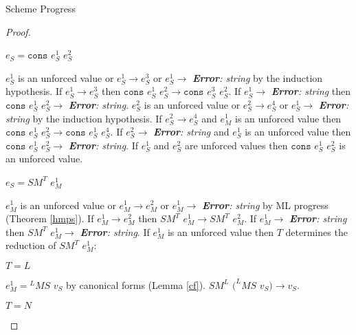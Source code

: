\begin{theorem}{Scheme Progress}
\begin{proof}
\begin{case}

$e_{S}=\mathtt{cons}$ $e_{S}^{1}$ $e_{S}^{2}$

$e_{S}^{1}$ is an unforced value or $e_{S}^{1}\rightarrow e_{S}^{3}$ or $e_{S}^{1}\rightarrow$ \emph{\textbf{Error}: string} by the induction hypothesis.  If $e_{S}^{1}\rightarrow e_{S}^{3}$ then $\mathtt{cons}$ $e_{S}^{1}$ $e_{S}^{2}\rightarrow\mathtt{cons}$ $e_{S}^{3}$ $e_{S}^{2}$.  If $e_{S}^{1}\rightarrow$ \emph{\textbf{Error}: string} then $\mathtt{cons}$ $e_{S}^{1}$ $e_{S}^{2}\rightarrow$ \emph{\textbf{Error}: string}.  $e_{S}^{2}$ is an unforced value or $e_{S}^{2}\rightarrow e_{S}^{4}$ or $e_{S}^{1}\rightarrow$ \emph{\textbf{Error}: string} by the induction hypothesis.  If $e_{S}^{2}\rightarrow e_{S}^{4}$ and $e_{M}^{1}$ is an unforced value then $\mathtt{cons}$ $e_{S}^{1}$ $e_{S}^{2}\rightarrow\mathtt{cons}$ $e_{S}^{1}$ $e_{S}^{4}$.  If $e_{S}^{2}\rightarrow$ \emph{\textbf{Error}: string} and $e_{S}^{1}$ is an unforced value then $\mathtt{cons}$ $e_{S}^{1}$ $e_{S}^{2}\rightarrow$ \emph{\textbf{Error}: string}.  If $e_{S}^{1}$ and $e_{S}^{2}$ are unforced values then $\mathtt{cons}$ $e_{S}^{1}$ $e_{S}^{2}$ is an unforced value.

\end{case}


\begin{case}

$e_{S}=SM^{T}$ $e_{M}^{1}$

$e_{M}^{1}$ is an unforced value or $e_{M}^{1}\rightarrow e_{M}^{2}$ or $e_{M}^{1}\rightarrow$ \emph{\textbf{Error}: string} by ML progress (Theorem \ref{hmps}).  If $e_{M}^{1}\rightarrow e_{M}^{2}$ then $SM^{T}$ $e_{M}^{1}\rightarrow SM^{T}$ $e_{M}^{2}$.  If $e_{M}^{1}\rightarrow$ \emph{\textbf{Error}: string} then $SM^{T}$ $e_{M}^{1}\rightarrow$ \emph{\textbf{Error}: string}.  If $e_{M}^{1}$ is an unforced value then $T$ determines the reduction of $SM^{T}$ $e_{M}^{1}$:

\begin{subcase}

$T=L$

$e_{M}^{1}={^{L}M}S$ $v_{S}$ by canonical forms (Lemma \ref{cf}).  $SM^{L}$ $(^{L}MS$ $v_{S})\rightarrow v_{S}$.

\end{subcase}

\begin{subcase}

$T=N$


\end{subcase}
\end{case}
\end{proof}
\end{theorem}

